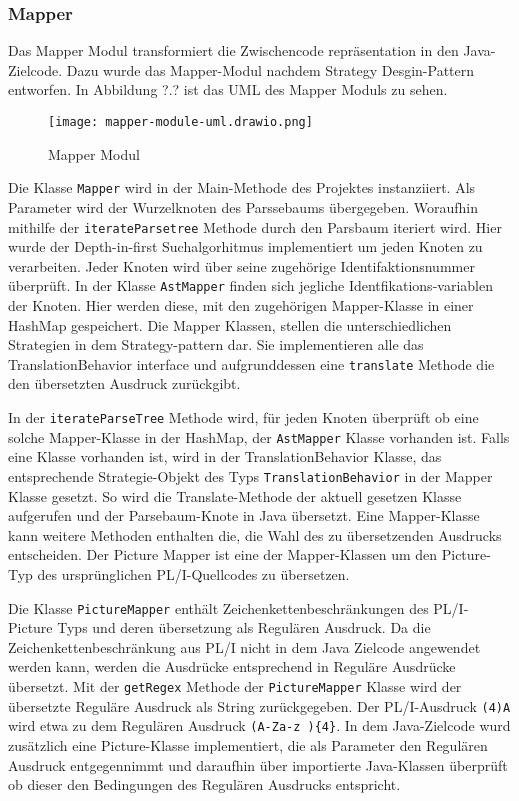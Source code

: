 \subsubsection{Mapper}
Das Mapper Modul transformiert die Zwischencode repräsentation in den Java-Zielcode. Dazu wurde das Mapper-Modul nachdem Strategy Desgin-Pattern entworfen.
In Abbildung ?.? ist das UML des Mapper Moduls zu sehen. 

\begin{figure}[h]
	\centering
	\caption{Mapper Modul}
	\texttt{[image: mapper-module-uml.drawio.png]}
	\label{fig:mapper}
\end{figure}

Die Klasse \verb+Mapper+ wird in der Main-Methode des Projektes instanziiert. Als Parameter wird der Wurzelknoten des Parssebaums übergegeben.
Woraufhin mithilfe der \verb+iterateParsetree+ Methode durch den Parsbaum iteriert wird. Hier wurde der Depth-in-first Suchalgorhitmus implementiert um
jeden Knoten zu verarbeiten. Jeder Knoten wird über seine zugehörige Identifaktionsnummer überprüft.  
In der Klasse \verb+AstMapper+ finden sich jegliche Identfikations-variablen der Knoten. Hier werden diese, mit den zugehörigen Mapper-Klasse in einer HashMap gespeichert.
Die Mapper Klassen, stellen die unterschiedlichen Strategien in dem Strategy-pattern dar. Sie implementieren alle das TranslationBehavior interface und 
aufgrunddessen eine \verb+translate+ Methode die den übersetzten Ausdruck zurückgibt. 

In der \verb+iterateParseTree+ Methode wird, für jeden Knoten überprüft ob eine solche Mapper-Klasse in der HashMap, der \verb+AstMapper+ Klasse vorhanden ist.
Falls eine Klasse vorhanden ist, wird in der TranslationBehavior Klasse, das entsprechende Strategie-Objekt des Typs \verb+TranslationBehavior+ in der
Mapper Klasse gesetzt. So wird die Translate-Methode der aktuell gesetzen Klasse aufgerufen und der Parsebaum-Knote in Java übersetzt.
Eine Mapper-Klasse kann weitere Methoden enthalten die, die Wahl des zu übersetzenden Ausdrucks entscheiden. Der Picture Mapper ist eine der Mapper-Klassen
um den Picture-Typ des ursprünglichen PL/I-Quellcodes zu übersetzen.

Die Klasse \verb+PictureMapper+ enthält Zeichenkettenbeschränkungen des PL/I-Picture Typs und deren übersetzung als Regulären Ausdruck.
Da die Zeichenkettenbeschränkung aus PL/I nicht in dem Java Zielcode angewendet werden kann, werden die Ausdrücke entsprechend in Reguläre Ausdrücke übersetzt.
Mit der \verb+getRegex+ Methode der \verb+PictureMapper+ Klasse wird der übersetzte Reguläre Ausdruck als String zurückgegeben.
Der PL/I-Ausdruck \verb+(4)A+ wird etwa zu dem Regulären Ausdruck \verb+(A-Za-z ){4}+. In dem Java-Zielcode wurd zusätzlich eine Picture-Klasse implementiert,
die als Parameter den Regulären Ausdruck entgegennimmt und daraufhin über importierte Java-Klassen überprüft ob dieser den Bedingungen des Regulären Ausdrucks entspricht.  

